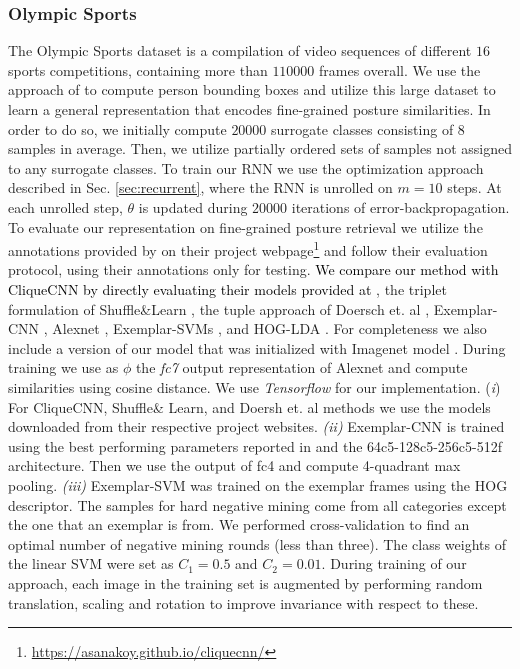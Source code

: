 \documentclass[10pt,twocolumn,letterpaper]{article}
\begin{document}
\subsubsection{Olympic Sports}\label{sec:olympic_metrics}

The Olympic Sports dataset \cite{olympic_sports} is a compilation of video sequences of different $16$ sports competitions, containing more than $110000$ frames overall. We use the approach of \cite{dpm} to compute person bounding boxes and utilize this large dataset to learn a general representation that encodes fine-grained posture similarities. In order to do so, we initially compute $20000$ surrogate classes consisting of $8$ samples in average. Then, we utilize partially ordered sets of samples not assigned to any surrogate classes. To train our RNN we use the optimization approach described in Sec. \ref{sec:recurrent}, where the RNN is unrolled on $m=10$ steps. At each unrolled step, $\theta$ is updated during $20000$ iterations of error-backpropagation. To evaluate our representation on fine-grained posture retrieval we utilize the annotations provided by \cite{cliquecnn} 
on their project webpage\footnote{\label{fn:cliquecnn} \url{https://asanakoy.github.io/cliquecnn/}} and follow their evaluation protocol, using their annotations only for testing. \textcolor{black}{We compare our method with CliqueCNN \cite{cliquecnn} by directly evaluating their models provided at \textsuperscript{\normalfont{\ref{fn:cliquecnn}}}}, the triplet formulation of Shuffle\&Learn \cite{shuffleandlearn}, the tuple approach of Doersch et. al \cite{ConvNetpretext1}, Exemplar-CNN \cite{exemplarcnn}, Alexnet \cite{alexnet}, Exemplar-SVMs \cite{exemplarsvm}, and HOG-LDA \cite{hoglda}. For completeness we also include a version of our model that was initialized with Imagenet model \cite{alexnet}. 
During training we use as $\phi$ the \emph{fc7} output representation of Alexnet and compute similarities using cosine distance. We use \emph{Tensorflow} \cite{tensorflow} for our implementation. (\emph{i}) For CliqueCNN, Shuffle\& Learn, and Doersh et. al methods we use the models downloaded from their respective project websites. \emph{(ii)} Exemplar-CNN is trained using the best performing parameters reported in \cite{exemplarcnn} and the 64c5-128c5-256c5-512f architecture. Then we use the output of fc4 and compute 4-quadrant max pooling. \emph{(iii)} Exemplar-SVM was trained on the exemplar frames using the HOG descriptor. The samples for hard negative mining come from all categories except the one that an exemplar is from. We performed cross-validation to find an optimal number of negative mining rounds (less than three). The class weights of the linear SVM were set as $C_1=0.5$ and $C_2=0.01$. During training of our approach, each image in the training set is augmented by performing random translation, scaling and rotation to improve invariance with respect to these.
\end{document}
